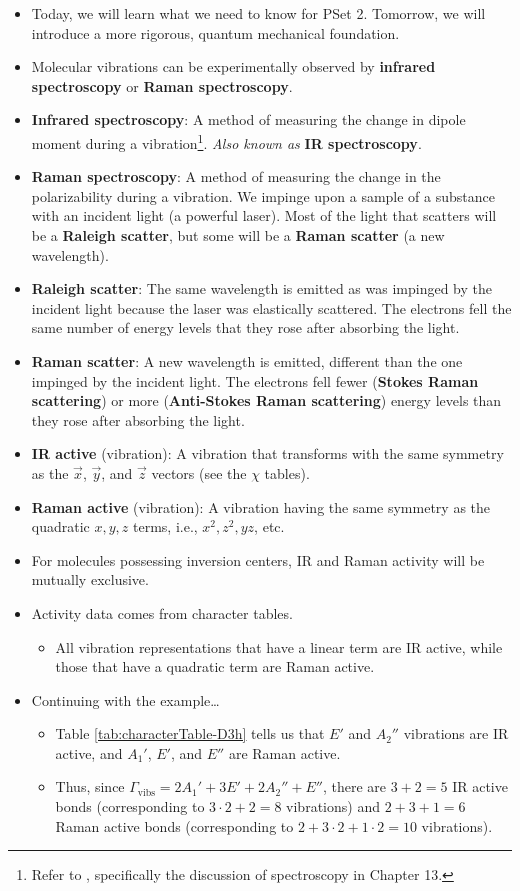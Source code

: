 \documentclass[../notes.tex]{subfiles}
\begin{document}
\begin{itemize}
    \item Today, we will learn what we need to know for PSet 2. Tomorrow, we will introduce a more rigorous, quantum mechanical foundation.
    \item Molecular vibrations can be experimentally observed by \textbf{infrared spectroscopy} or \textbf{Raman spectroscopy}.
    \item \textbf{Infrared spectroscopy}: A method of measuring the change in dipole moment during a vibration\footnote{Refer to \textcite{bib:APChemNotes}, specifically the discussion of spectroscopy in Chapter 13.}. \emph{Also known as} \textbf{IR spectroscopy}.
    \item \textbf{Raman spectroscopy}: A method of measuring the change in the polarizability during a vibration. We impinge upon a sample of a substance with an incident light (a powerful laser). Most of the light that scatters will be a \textbf{Raleigh scatter}, but some will be a \textbf{Raman scatter} (a new wavelength).
    \item \textbf{Raleigh scatter}: The same wavelength is emitted as was impinged by the incident light because the laser was elastically scattered. The electrons fell the same number of energy levels that they rose after absorbing the light.
    \item \textbf{Raman scatter}: A new wavelength is emitted, different than the one impinged by the incident light. The electrons fell fewer (\textbf{Stokes Raman scattering}) or more (\textbf{Anti-Stokes Raman scattering}) energy levels than they rose after absorbing the light.
    \item \textbf{IR active} (vibration): A vibration that transforms with the same symmetry as the $\vec{x}$, $\vec{y}$, and $\vec{z}$ vectors (see the $\chi$ tables).
    \item \textbf{Raman active} (vibration): A vibration having the same symmetry as the quadratic $x,y,z$ terms, i.e., $x^2,z^2,yz$, etc.
    \item For molecules possessing inversion centers, IR and Raman activity will be mutually exclusive.
    \item Activity data comes from character tables.
    \begin{itemize}
        \item All vibration representations that have a linear term are IR active, while those that have a quadratic term are Raman active.
    \end{itemize}
    \item Continuing with the  example\dots
    \begin{itemize}
        \item Table \ref{tab:characterTable-D3h} tells us that $E'$ and $A_2''$ vibrations are IR active, and $A_1'$, $E'$, and $E''$ are Raman active.
        \item Thus, since $\Gamma_\text{vibs}=2A_1'+3E'+2A_2''+E''$, there are $3+2=5$ IR active bonds (corresponding to $3\cdot 2+2=8$ vibrations) and $2+3+1=6$ Raman active bonds (corresponding to $2+3\cdot 2+1\cdot 2=10$ vibrations).
    \end{itemize}
\end{itemize}
\end{document}
